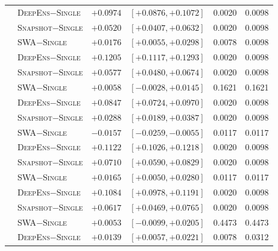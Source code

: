 \documentclass[11pt,a4paper]{article}
\newcommand{\deepens}{\textsc{DeepEns}}
\newcommand{\snapshot}{\textsc{Snapshot}}
\newcommand{\swa}{\textsc{SWA}}
\newcommand{\single}{\textsc{Single}}
\begin{document}
\begin{table}[htbp]
\begin{tabular*}{\textwidth}{@{\extracolsep{\fill}} llcccc}
 & \deepens{}$-$\single{} & $+0.0974$ & $[+0.0876,+0.1072]$ & 0.0020 & 0.0098 \\
 & \snapshot{}$-$\single{} & $+0.0520$ & $[+0.0407,+0.0632]$ & 0.0020 & 0.0098 \\
 & \swa{}$-$\single{} & $+0.0176$ & $[+0.0055,+0.0298]$ & 0.0078 & 0.0098 \\
 & \deepens{}$-$\single{} & $+0.1205$ & $[+0.1117,+0.1293]$ & 0.0020 & 0.0098 \\
 & \snapshot{}$-$\single{} & $+0.0577$ & $[+0.0480,+0.0674]$ & 0.0020 & 0.0098 \\
 & \swa{}$-$\single{} & $+0.0058$ & $[-0.0028,+0.0145]$ & 0.1621 & 0.1621 \\
 & \deepens{}$-$\single{} & $+0.0847$ & $[+0.0724,+0.0970]$ & 0.0020 & 0.0098 \\
 & \snapshot{}$-$\single{} & $+0.0288$ & $[+0.0189,+0.0387]$ & 0.0020 & 0.0098 \\
 & \swa{}$-$\single{} & $-0.0157$ & $[-0.0259,-0.0055]$ & 0.0117 & 0.0117 \\
 & \deepens{}$-$\single{} & $+0.1122$ & $[+0.1026,+0.1218]$ & 0.0020 & 0.0098 \\
 & \snapshot{}$-$\single{} & $+0.0710$ & $[+0.0590,+0.0829]$ & 0.0020 & 0.0098 \\
 & \swa{}$-$\single{} & $+0.0165$ & $[+0.0050,+0.0280]$ & 0.0117 & 0.0117 \\
 & \deepens{}$-$\single{} & $+0.1084$ & $[+0.0978,+0.1191]$ & 0.0020 & 0.0098 \\
 & \snapshot{}$-$\single{} & $+0.0617$ & $[+0.0469,+0.0765]$ & 0.0020 & 0.0098 \\
 & \swa{}$-$\single{} & $+0.0053$ & $[-0.0099,+0.0205]$ & 0.4473 & 0.4473 \\
 & \deepens{}$-$\single{} & $+0.0139$ & $[+0.0057,+0.0221]$ & 0.0078 & 0.0312 \\

\end{tabular*}
\end{table}
\end{document}
